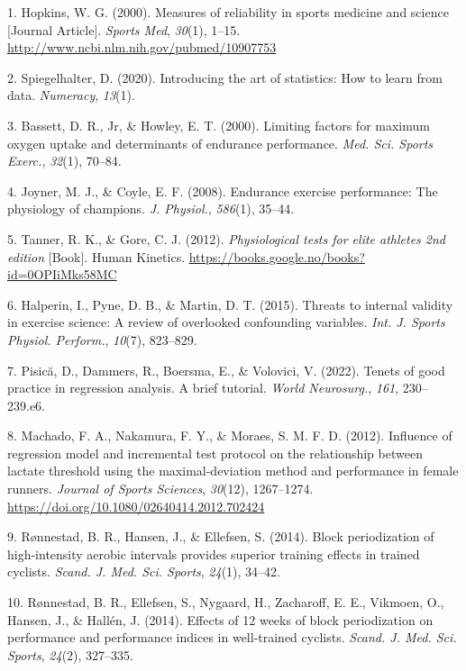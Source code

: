 \documentclass[
  letterpaper,
  DIV=11,
  numbers=noendperiod]{scrreprt}
\newlength{\cslhangindent}
\newenvironment{CSLReferences}[2] %
 {\begin{list}{}{%
  \setlength{\itemindent}{0pt}
  \setlength{\leftmargin}{0pt}
  \setlength{\parsep}{0pt}
  \ifodd #1
   \setlength{\leftmargin}{\cslhangindent}
   \setlength{\itemindent}{-1\cslhangindent}
  \fi
  \setlength{\itemsep}{#2\baselineskip}}}
 {\end{list}}
\begin{document}
\begin{CSLReferences}{1}{0}
1. Hopkins, W. G. (2000). Measures of reliability in sports medicine and
science {[}Journal Article{]}. \emph{Sports Med}, \emph{30}(1), 1--15.
\url{http://www.ncbi.nlm.nih.gov/pubmed/10907753}

2. Spiegelhalter, D. (2020). Introducing the art of statistics: How to
learn from data. \emph{Numeracy}, \emph{13}(1).

3. Bassett, D. R., Jr, \& Howley, E. T. (2000). Limiting factors for
maximum oxygen uptake and determinants of endurance performance.
\emph{Med. Sci. Sports Exerc.}, \emph{32}(1), 70--84.

4. Joyner, M. J., \& Coyle, E. F. (2008). Endurance exercise
performance: The physiology of champions. \emph{J. Physiol.},
\emph{586}(1), 35--44.

5. Tanner, R. K., \& Gore, C. J. (2012). \emph{Physiological tests for
elite athletes 2nd edition} {[}Book{]}. Human Kinetics.
\url{https://books.google.no/books?id=0OPIiMks58MC}

6. Halperin, I., Pyne, D. B., \& Martin, D. T. (2015). Threats to
internal validity in exercise science: A review of overlooked
confounding variables. \emph{Int. J. Sports Physiol. Perform.},
\emph{10}(7), 823--829.

7. Pisică, D., Dammers, R., Boersma, E., \& Volovici, V. (2022). Tenets
of good practice in regression analysis. A brief tutorial. \emph{World
Neurosurg.}, \emph{161}, 230--239.e6.

8. Machado, F. A., Nakamura, F. Y., \& Moraes, S. M. F. D. (2012).
Influence of regression model and incremental test protocol on the
relationship between lactate threshold using the maximal-deviation
method and performance in female runners. \emph{Journal of Sports
Sciences}, \emph{30}(12), 1267--1274.
\url{https://doi.org/10.1080/02640414.2012.702424}

9. Rønnestad, B. R., Hansen, J., \& Ellefsen, S. (2014). Block
periodization of high-intensity aerobic intervals provides superior
training effects in trained cyclists. \emph{Scand. J. Med. Sci. Sports},
\emph{24}(1), 34--42.

10. Rønnestad, B. R., Ellefsen, S., Nygaard, H., Zacharoff, E. E.,
Vikmoen, O., Hansen, J., \& Hallén, J. (2014). Effects of 12 weeks of
block periodization on performance and performance indices in
well-trained cyclists. \emph{Scand. J. Med. Sci. Sports}, \emph{24}(2),
327--335.


\end{CSLReferences}
\end{document}
